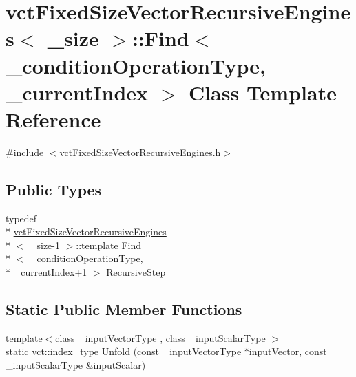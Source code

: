 \hypertarget{classvct_fixed_size_vector_recursive_engines_1_1_find}{\section{vct\-Fixed\-Size\-Vector\-Recursive\-Engines$<$ \-\_\-size $>$\-:\-:Find$<$ \-\_\-condition\-Operation\-Type, \-\_\-current\-Index $>$ Class Template Reference}
\label{classvct_fixed_size_vector_recursive_engines_1_1_find}
}


{\ttfamily \#include $<$vct\-Fixed\-Size\-Vector\-Recursive\-Engines.\-h$>$}

\subsection*{Public Types}
\begin{DoxyCompactItemize}
\item 
typedef \\*
\hyperlink{classvct_fixed_size_vector_recursive_engines}{vct\-Fixed\-Size\-Vector\-Recursive\-Engines}\\*
$<$ \-\_\-size-\/1 $>$\-::template \hyperlink{classvct_fixed_size_vector_recursive_engines_1_1_find}{Find}\\*
$<$ \-\_\-condition\-Operation\-Type, \\*
\-\_\-current\-Index+1 $>$ \hyperlink{classvct_fixed_size_vector_recursive_engines_1_1_find_aae2588d04bd3f2f1cd9daff01c63f334}{Recursive\-Step}
\end{DoxyCompactItemize}
\subsection*{Static Public Member Functions}
\begin{DoxyCompactItemize}
\item 
{\footnotesize template$<$class \-\_\-input\-Vector\-Type , class \-\_\-input\-Scalar\-Type $>$ }\\static \hyperlink{namespacevct_a50405d87494dce1f22ee3930ca285ee9}{vct\-::index\-\_\-type} \hyperlink{classvct_fixed_size_vector_recursive_engines_1_1_find_a89ea50c19849424df4e14b9a7f63a74d}{Unfold} (const \-\_\-input\-Vector\-Type $\ast$input\-Vector, const \-\_\-input\-Scalar\-Type \&input\-Scalar)
\end{DoxyCompactItemize}


